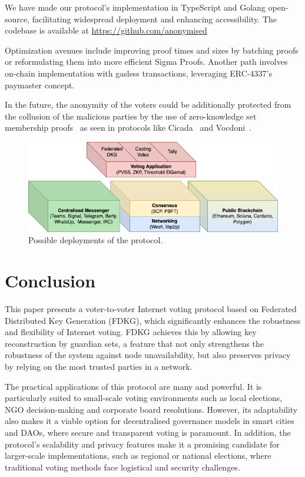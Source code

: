 \documentclass[runningheads]{llncs}
\begin{document}
We have made our protocol's implementation in TypeScript and Golang open-source, facilitating widespread deployment and enhancing accessibility. The codebase is available at \url{https://github.com/anonymised} %

Optimization avenues include improving proof times and sizes by batching proofs or reformulating them into more efficient Sigma Proofs. Another path involves on-chain implementation with gasless transactions, leveraging ERC-4337's paymaster concept.

In the future, the anonymity of the voters could be additionally protected from the collusion of the malicious parties by the use of zero-knowledge set membership proofs~\cite{Semaphorea} as seen in protocols like Cicada~\cite{BuildingCicadaPrivate} and Vocdoni~\cite{VocdoniIntroductionVocdoni}.

\begin{figure}
    \centering
    \includegraphics[width=\textwidth]{stack-bc.png}
    \caption{Possible deployments of the protocol.}
    \label{fig:stack-bc}
\end{figure}

\section{Conclusion}
This paper presents a voter-to-voter Internet voting protocol based on Federated Distributed Key Generation (FDKG), which significantly enhances the robustness and flexibility of Internet voting. FDKG achieves this by allowing key reconstruction by guardian sets, a feature that not only strengthens the robustness of the system against node unavailability, but also preserves privacy by relying on the most trusted parties in a network.

The practical applications of this protocol are many and powerful. It is particularly suited to small-scale voting environments such as local elections, NGO decision-making and corporate board resolutions. However, its adaptability also makes it a viable option for decentralised governance models in smart cities and DAOs, where secure and transparent voting is paramount. In addition, the protocol's scalability and privacy features make it a promising candidate for larger-scale implementations, such as regional or national elections, where traditional voting methods face logistical and security challenges.
\end{document}
